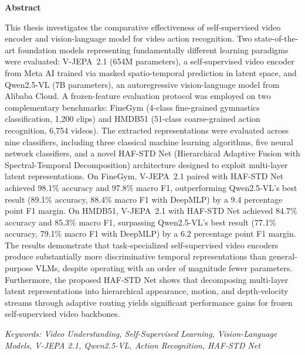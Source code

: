 
\newpage
{}
{}

\begin{center}
{\fontsize{16}{20}\selectfont \textbf{Abstract}}
\end{center}

\vspace{0.5cm}

\noindent
This thesis investigates the comparative effectiveness of self-supervised video encoder and vision-language model for video action recognition. Two state-of-the-art foundation models representing fundamentally different learning paradigms were evaluated: V-JEPA~2.1 (654M parameters), a self-supervised video encoder from Meta AI trained via masked spatio-temporal prediction in latent space, and Qwen2.5-VL (7B parameters), an autoregressive vision-language model from Alibaba Cloud. A frozen-feature evaluation protocol was employed on two complementary benchmarks: FineGym (4-class fine-grained gymnastics classification, 1,200 clips) and HMDB51 (51-class coarse-grained action recognition, 6,754 videos). The extracted representations were evaluated across nine classifiers, including three classical machine learning algorithms, five neural network classifiers, and a novel HAF-STD Net (Hierarchical Adaptive Fusion with Spectral-Temporal Decomposition) architecture designed to exploit multi-layer latent representations. On FineGym, V-JEPA~2.1 paired with HAF-STD Net achieved 98.1\% accuracy and 97.8\% macro F1, outperforming Qwen2.5-VL's best result (89.1\% accuracy, 88.4\% macro F1 with DeepMLP) by a 9.4 percentage point F1 margin. On HMDB51, V-JEPA~2.1 with HAF-STD Net achieved 84.7\% accuracy and 85.3\% macro F1, surpassing Qwen2.5-VL's best result (77.1\% accuracy, 79.1\% macro F1 with DeepMLP) by a 6.2 percentage point F1 margin. The results demonstrate that task-specialized self-supervised video encoders produce substantially more discriminative temporal representations than general-purpose VLMs, despite operating with an order of magnitude fewer parameters. Furthermore, the proposed HAF-STD Net shows that decomposing multi-layer latent representations into hierarchical appearance, motion, and depth-velocity streams through adaptive routing yields significant performance gains for frozen self-supervised video backbones.

\vspace{0.8cm}
\noindent
{\fontsize{10}{13}\selectfont \textit{Keywords: Video Understanding, Self-Supervised Learning, Vision-Language Models, V-JEPA 2.1, Qwen2.5-VL, Action Recognition, HAF-STD Net}}

